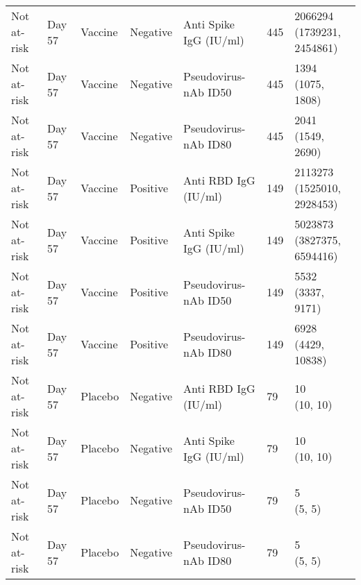 \documentclass[]{book}
\theoremstyle{definition}
\theoremstyle{definition}
\theoremstyle{definition}
\newcommand{\1}{\mathbbm{1}}
\begin{document}
\begin{landscape}
\begin{ThreePartTable}
\begin{longtable}[t]{>{\raggedright\arraybackslash}p{7cm}llllll}
\hspace{1em}Not at-risk & Day 57 & Vaccine & Negative & Anti Spike IgG (IU/ml) & 445 & \makecell[l]{2066294\\(1739231, 2454861)}\\
\hspace{1em}Not at-risk & Day 57 & Vaccine & Negative & Pseudovirus-nAb ID50 & 445 & \makecell[l]{1394\\(1075, 1808)}\\
\hspace{1em}Not at-risk & Day 57 & Vaccine & Negative & Pseudovirus-nAb ID80 & 445 & \makecell[l]{2041\\(1549, 2690)}\\
\hspace{1em}Not at-risk & Day 57 & Vaccine & Positive & Anti RBD IgG (IU/ml) & 149 & \makecell[l]{2113273\\(1525010, 2928453)}\\
\hspace{1em}Not at-risk & Day 57 & Vaccine & Positive & Anti Spike IgG (IU/ml) & 149 & \makecell[l]{5023873\\(3827375, 6594416)}\\
\hspace{1em}Not at-risk & Day 57 & Vaccine & Positive & Pseudovirus-nAb ID50 & 149 & \makecell[l]{5532\\(3337, 9171)}\\
\hspace{1em}Not at-risk & Day 57 & Vaccine & Positive & Pseudovirus-nAb ID80 & 149 & \makecell[l]{6928\\(4429, 10838)}\\
\hspace{1em}Not at-risk & Day 57 & Placebo & Negative & Anti RBD IgG (IU/ml) & 79 & \makecell[l]{10\\(10, 10)}\\
\hspace{1em}Not at-risk & Day 57 & Placebo & Negative & Anti Spike IgG (IU/ml) & 79 & \makecell[l]{10\\(10, 10)}\\
\hspace{1em}Not at-risk & Day 57 & Placebo & Negative & Pseudovirus-nAb ID50 & 79 & \makecell[l]{5\\(5, 5)}\\
\hspace{1em}Not at-risk & Day 57 & Placebo & Negative & Pseudovirus-nAb ID80 & 79 & \makecell[l]{5\\(5, 5)}\\

\end{longtable}
\end{ThreePartTable}
\end{landscape}
\end{document}
